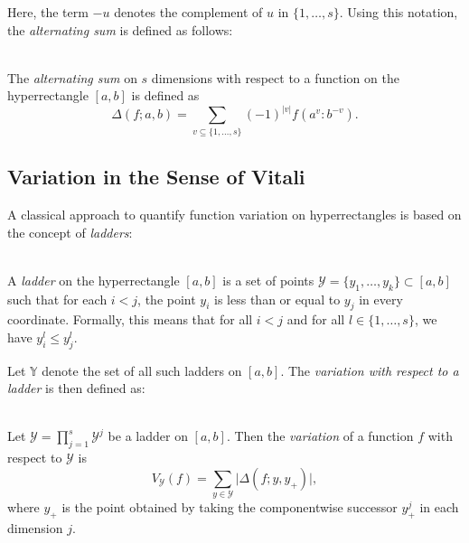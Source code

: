 Here, the term $-u$ denotes the complement of $u$ in $\{1, \dots, s\}$. Using this notation, the \emph{alternating sum} is defined as follows:

\begin{definition} \ \\
    The \emph{alternating sum} on $s$ dimensions with respect to a function on
    the hyperrectangle $[a,b]$ is defined as
    \begin{equation*}
        \Delta(f; a, b) = \sum_{v \subseteq \{1,\dots,s\}} (-1)^{|v|} f(a^v:b^{-v}).
    \end{equation*}
\end{definition}

\subsection{Variation in the Sense of Vitali}
\label{sec:vitali-variation}

A classical approach to quantify function variation on hyperrectangles is based on the concept of \emph{ladders}:

\begin{definition}[Ladder] \ \\
    A \emph{ladder} on the hyperrectangle $[a,b]$ is a set of points $\mathcal{Y} =
    \{y_1, \dots, y_k\} \subset [a,b]$ such that for each $i < j$, the point
    $y_i$ is less than or equal to $y_j$ in every coordinate. Formally, this
    means that for all $i < j$ and for all $l \in \{1, \dots, s\}$, we have
    $y_i^l \leq y_j^l$.
\end{definition}

Let $\mathbb{Y}$ denote the set of all such ladders on $[a,b]$. The \emph{variation with respect to a ladder} is then defined as:

\begin{definition} \ \\
    Let $\mathcal{Y} = \prod_{j=1}^s \mathcal{Y}^j$ be a ladder on $[a,b]$. Then the \emph{variation} of a function $f$ with respect to $\mathcal{Y}$ is
    \begin{equation*}
        V_\mathcal{Y}(f) = \sum_{y \in \mathcal{Y}} \big| \Delta(f; y, y_+) \big|,
    \end{equation*}
    where $y_+$ is the point obtained by taking the componentwise successor $y^j_+$ in each dimension $j$.
\end{definition}


